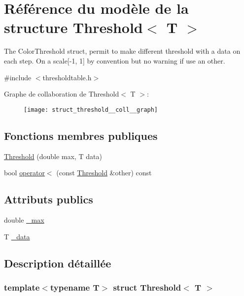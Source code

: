\hypertarget{struct_threshold}{}\section{Référence du modèle de la structure Threshold$<$ T $>$}
\label{struct_threshold}


The Color\+Threshold struct, permit to make different threshold with a data on each step. On a scale\mbox{[}-\/1, 1\mbox{]} by convention but no warning if use an other.  




{\ttfamily \#include $<$thresholdtable.\+h$>$}



Graphe de collaboration de Threshold$<$ T $>$\+:
\nopagebreak
\begin{figure}[H]
\begin{center}
\leavevmode
\texttt{[image: struct\_threshold\_\_coll\_\_graph]}
\end{center}
\end{figure}
\subsection*{Fonctions membres publiques}
\begin{DoxyCompactItemize}
\item 
\hyperlink{struct_threshold_acff40589799e19c56704bf23fa25cdf5}{Threshold} (double max, T data)
\item 
bool \hyperlink{struct_threshold_a40250fbaa1d32ec4992aa7bc32480f00}{operator$<$} (const \hyperlink{struct_threshold}{Threshold} \&other) const
\end{DoxyCompactItemize}
\subsection*{Attributs publics}
\begin{DoxyCompactItemize}
\item 
double \hyperlink{struct_threshold_a45ccfaf161df097939ca2014d990c41f}{\+\_\+max}
\item 
T \hyperlink{struct_threshold_ac2020d28bcb091ebfa9a6e967cc652a3}{\+\_\+data}
\end{DoxyCompactItemize}


\subsection{Description détaillée}
\subsubsection*{template$<$typename T$>$\newline
struct Threshold$<$ T $>$}

